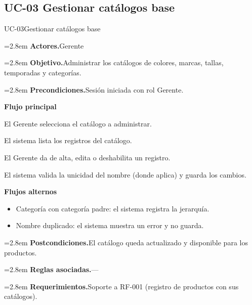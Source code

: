 \documentclass[11pt]{article}
\newcommand{\fila}[2]{\par\smallskip\noindent\hangindent=2.8em\hangafter=0
  \textbf{\sffamily\color{brand!80!black}#1.}\hspace{0.4em}#2\par}
\newcommand{\bloque}[1]{\par\smallskip\noindent\textbf{\sffamily\color{brand!80!black}#1}\par\nopagebreak}
\newenvironment{alternos}{\begin{itemize}[leftmargin=2.9em, itemsep=0.2ex, topsep=0.3ex]}{\end{itemize}}
\begin{document}
\subsection{UC-03 Gestionar catálogos base}
\begin{ficha}{UC-03}{Gestionar catálogos base}
\fila{Actores}{Gerente}
\fila{Objetivo}{Administrar los catálogos de colores, marcas, tallas, temporadas y categorías.}
\fila{Precondiciones}{Sesión iniciada con rol Gerente.}
\bloque{Flujo principal}
\begin{pasos}
  \item El Gerente selecciona el catálogo a administrar.
  \item El sistema lista los registros del catálogo.
  \item El Gerente da de alta, edita o deshabilita un registro.
  \item El sistema valida la unicidad del nombre (donde aplica) y guarda los cambios.
\end{pasos}
\bloque{Flujos alternos}
\begin{alternos}
  \item[\textbf{3a.}] Categoría con categoría padre: el sistema registra la jerarquía.
  \item[\textbf{4a.}] Nombre duplicado: el sistema muestra un error y no guarda.
\end{alternos}
\fila{Postcondiciones}{El catálogo queda actualizado y disponible para los productos.}
\fila{Reglas asociadas}{---}
\fila{Requerimientos}{Soporte a RF-001 (registro de productos con sus catálogos).}
\end{ficha}
\end{document}
